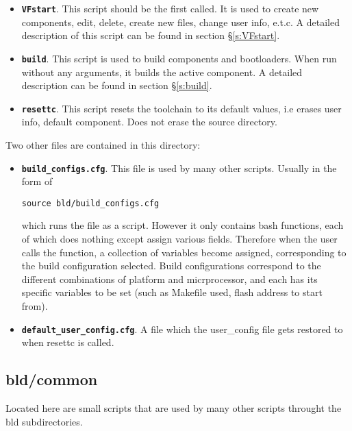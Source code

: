 \documentclass[a4paper, oneside, 11pt, titlepage, onecolumn, openright]{report}
\begin{document}
\begin{itemize}
			\label{bldscripts}
\item \label{VFstartsummary}\textbf{\texttt{VFstart}}. This script should be the first called. It is used to create new components, edit, delete, create new files, change user info, e.t.c. A detailed description of this script can be found in section \S\ref{s:VFstart}.

\item \label{buildsummary}\textbf{\texttt{build}}. This script is used to build components and bootloaders. When run without any arguments, it builds the active component.  A detailed description can be found in section \S\ref{s:build}.

\item \label{resettcsummary}\textbf{\texttt{resettc}}. This script resets the toolchain to its default values, i.e erases user info, default component. Does not erase the source directory.

\end{itemize}

Two other files are contained in this directory: 

\begin{itemize}

\item \textbf{\texttt{build\_configs.cfg}}. This file is used by many other scripts. Usually in the form of 
\begin{lstlisting}
source bld/build_configs.cfg
\end{lstlisting}
which runs the file as a script. However it only contains bash functions, each of which does nothing except assign various fields. Therefore when the user calls the function, a collection of variables become assigned, corresponding to the build configuration selected. Build configurations correspond to the different combinations of platform and micrprocessor, and each has its specific variables to be set (such as Makefile used, flash address to start from).

\item \textbf{\texttt{default\_user\_config.cfg}}. A file which the user\_config file gets restored to when resettc is called.

\end{itemize}


\subsection{bld/common}
			\label{ss:bld/common}
			Located here are small scripts that are used by many other scripts throught the bld subdirectories. 
			
\end{document}
